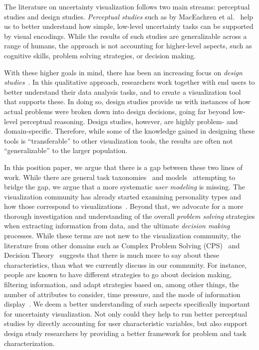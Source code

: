 
The literature on uncertainty visualization follows two main streams: perceptual studies and design studies.
\emph{Perceptual studies} such as by MacEachren et al.~\citep{MacEachren:2012} 
help us to better understand 
how simple, low-level uncertainty tasks can be supported by visual encodings. 
While the results of such studies are generalizable across a  
range of humans, the approach is not accounting for higher-level aspects, such as cognitive skills,
problem solving strategies, or decision making.

With these higher goals in mind, there has been an increasing focus on \emph{design studies}~\citep{Sedlmair:2012}.
In this qualitative approach, researchers work together with end users to better understand their 
data analysis tasks, and to create a visualization tool
that supports these. In doing so, design studies provide us with instances of how
actual problems were broken down into design decisions, going far beyond
low-level perceptual reasoning. Design studies, however, are highly problem- and domain-specific.
Therefore, while some of the knowledge gained in designing these tools is
``transferable'' to other visualization tools, the results are often not
``generalizable'' to the larger population. %

In this position paper, we argue that there is a gap between these two lines of work.
While there are general task taxonomies~\citep{Brehmer:2013,Shneiderman:1996} and 
models~\citep{Tory:2004,Sedlmair:2014}
attempting to bridge the gap, we argue that a more systematic \emph{user modeling} is missing.
The visualization community has already started examining personality types and
how those correspond to visualizations~\citep{Conati:2014}. Beyond that, we advocate for a more thorough 
investigation and understanding of the overall \emph{problem solving} strategies when extracting information from data, 
and the ultimate \emph{decision making} processes.
While these terms are not new to the visualization community, the 
literature from other domains such as Complex Problem Solving (CPS)~\citep{Frensch:2005}
and Decision Theory~\citep{Payne:1993} suggests that there is much more to say about these characteristics,
than what we currently discuss in our community. For instance, people are known to have different strategies to go about decision making, filtering information,
and adapt strategies based on, among other things, the number of attributes 
to consider, time pressure, and the mode of information 
display~\cite{Payne:1993}.
We deem a better understanding of such aspects specifically important for uncertainty visualization.
Not only could they help to run better perceptual studies by directly accounting for user characteristic variables,
but also support design study researchers
by providing a better framework for problem and task characterization.

